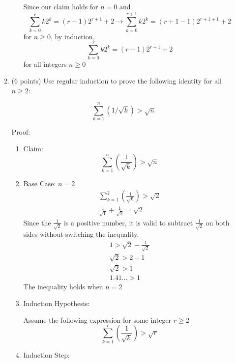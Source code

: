 \documentclass[10pt,letterpaper,unboxed,cm]{article}
\begin{document}
\begin{enumerate}
\begin{enumerate}
\begin{enumerate}
    
    Since our claim holds for $n=0$ and 
    $$\sum_{k = 0}^{r} k2^k = (r-1)2^{r+1} + 2 \xrightarrow{} \sum_{k=0}^{r+1}k2^k = (r+1-1)2^{r+1+1}+2$$
    for $n \geq 0$, by induction, 
    $$\sum_{k = 0}^{r} k2^k = (r-1)2^{r+1} + 2$$
    for all integers $n \geq 0$

    
\end{enumerate}

\item (6 points)
Use regular induction to prove the following identity for all $n\geq 2$:

$$\sum_{k=1}^n \left(1/\sqrt{k}\right) > \sqrt{n}$$

Proof:
\begin{enumerate}
\item Claim: 
$$
\sum_{k=1}^{n}(\frac{1}{\sqrt{k}}) > \sqrt{n}
$$
\item Base Case: $n = 2$
\begin{align*}
    \sum_{k=1}^{2}(\frac{1}{\sqrt{k}}) >\sqrt{2}\\
    \frac{1}{\sqrt{1}} + \frac{1}{\sqrt{2}} = \sqrt{2}
\end{align*}
Since the $\frac{1}{\sqrt{2}}$ is a positive number, it is valid to subtract $\frac{1}{\sqrt{2}}$ on both sides without switching the inequality.
\begin{align*}
    1 > \sqrt{2}-\frac{1}{\sqrt{2}}\\
    \sqrt{2} > 2 - 1\\
    \sqrt{2} > 1\\
    1.41... > 1
\end{align*}
The inequality holds when $n = 2$
\item Induction Hypothesis:

Assume the following expression for some integer $r \geq 2$
$$
    \sum_{k=1}^{r}(\frac{1}{\sqrt{k}}) > \sqrt{r}
$$
\item Induction Step:



\end{enumerate}
\end{enumerate}
\end{enumerate}
\end{document}
